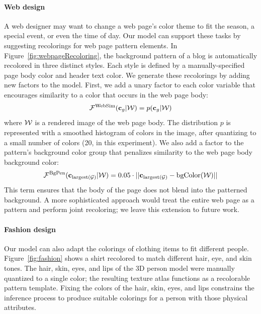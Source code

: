 \paragraph{Web design}
A web designer may want to change a web page's color theme to fit the season, a special event, or even the time of day. Our model can support these tasks by suggesting recolorings for web page pattern elements. In Figure~\ref{fig:webpageRecoloring}, the background pattern of a blog is automatically recolored in three distinct styles. Each style is defined by a manually-specified page body color and header text color. We generate these recolorings by adding new factors to the model. First, we add a unary factor to each color variable that encourages similarity to a color that occurs in the web page body:
\begin{equation*}
\mathcal{F}^\textrm{WebSim}(\mathbf{c}_g | \mathcal{W}) = p(\mathbf{c}_g | \mathcal{W})
\end{equation*}
where $\mathcal{W}$ is a rendered image of the web page body. The distribution $p$ is represented with a smoothed histogram of colors in the image, after quantizing to a small number of colors (20, in this experiment).
We also add a factor to the pattern's background color group that penalizes similarity to the web page body background color:
\begin{equation*}
\mathcal{F}^\textrm{BgPen}(\mathbf{c}_{\textrm{largest}(\mathcal{G})} | \mathcal{W}) = 0.05 \cdot || \mathbf{c}_{\textrm{largest}(\mathcal{G})} - \textrm{bgColor}(\mathcal{W}) ||
\end{equation*}
This term ensures that the body of the page does not blend into the patterned background. A more sophisticated approach would treat the entire web page as a pattern and perform joint recoloring; we leave this extension to future work.

\paragraph{Fashion design}
Our model can also adapt the colorings of clothing items to fit different people. Figure~\ref{fig:fashion} shows a shirt recolored to match different hair, eye, and skin tones. The hair, skin, eyes, and lips of the 3D person model were manually quantized to a single color; the resulting texture atlas functions as a recolorable pattern template. Fixing the colors of the hair, skin, eyes, and lips constrains the inference process to produce suitable colorings for a person with those physical attributes.

